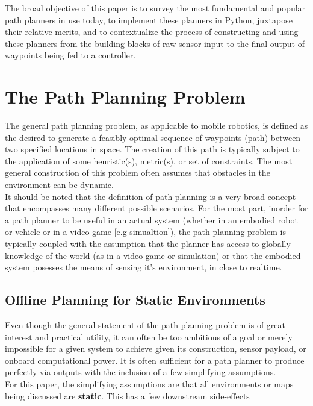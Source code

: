 \documentclass[journal]{IEEEtran}
\begin{document}
The broad objective of this paper is to survey the most fundamental and popular path planners in use today, to implement these planners in Python, juxtapose their relative merits, and to contextualize the process of constructing and using these planners from the building blocks of raw sensor input to the final output of waypoints being fed to a controller.   

\section{The Path Planning Problem} 
The general path planning problem, as applicable to mobile robotics, is defined as the desired to generate a feasibly optimal sequence of waypoints (path) between two specified locations in space. The creation of this path is typically subject to the application of some heuristic(s), metric(s), or set of constraints. The most general construction of this problem often assumes that obstacles in the environment can be dynamic. \\


It should be noted that the definition of path planning is a very broad concept that encompasses many different possible scenarios. For the most part, inorder for a path planner to be useful in an actual system (whether in an embodied robot or vehicle or in a video game [e.g simualtion]), the path planning problem is typically coupled with the assumption that the planner has access to globally knowledge of the world (as in a video game or simulation) or that the embodied system posesses the means of sensing it's environment, in close to realtime. 

\subsection{Offline Planning for Static Environments}
Even though the general statement of the path planning problem is of great interest and practical utility, it can often be too ambitious of a goal or merely impossible for a given system to achieve given its construction, sensor payload, or onboard computational power. It is often sufficient for a path planner to produce perfectly via outputs with the inclusion of a few simplifying assumptions. \\

For this paper, the simplifying assumptions are that all environments or maps being discussed are \textbf{static}. This has a few downstream side-effects  
\end{document}
